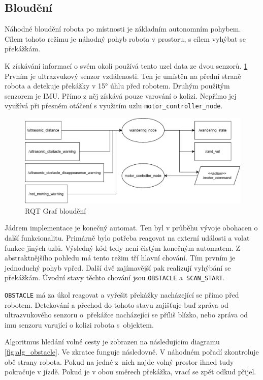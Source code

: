 \subsection*{Bloudění}
Náhodné bloudění robota po místnosti je základním autonomním pohybem. Cílem tohoto režimu je náhodný pohyb robota v prostoru, s cílem vyhýbat se překážkám.

K získávání informací o svém okolí používá tento uzel data ze dvou senzorů. \ref{fig:rqt_wandering} Prvním je ultrazvukový senzor vzdálenosti. Ten je umístěn na přední straně robota a detekuje překážky v 15° úhlu před robotem. Druhým použitým senzorem je IMU. Přímo z něj získává pouze varování o kolizi. Nepřímo jej využívá při přesném otáčení s využitím uzlu \verb|motor_controller_node|.

\begin{figure}[h!]
	\centering
	\includegraphics[scale=0.75]{obrazky-figures/wandering_rqt.pdf}
	\caption{RQT Graf bloudění}
	\label{fig:rqt_wandering}
\end{figure}

Jádrem implementace je konečný automat. Ten byl v průběhu vývoje obohacen o další funkcionalitu. Primárně bylo potřeba reagovat na externí události a volat funkce jiných uzlů. Výsledný kód tedy není čistým konečným automatem. Z abstraktnějšího pohledu má tento režim tří hlavní chování. Tím prvním je jednoduchý pohyb vpřed. Další dvě zajímavější pak realizují vyhýbání se překážkám. Úvodní stavy těchto chování jsou \verb|OBSTACLE| a~\verb|SCAN_START|.

\verb|OBSTACLE| má za úkol reagovat a vyřešit překážky nacházející se přímo před robotem. Detekování a přechod do tohoto stavu zajišťuje buď zpráva od ultrazvukového senzoru o~překážce nacházející se příliš blízko, nebo zpráva od imu senzoru varující o kolizi robota s~objektem.

Algoritmus hledání volné cesty je zobrazen na následujícím diagramu \ref{fig:alg_obstacle}. Ve zkratce funguje následovně. V náhodném pořadí zkontroluje obě strany robota. Pokud na jedné z~nich najde volný prostor ihned tudy pokračuje v jízdě. Pokud je v obou směrech překážka, vrací se zpět odkud přijel.

